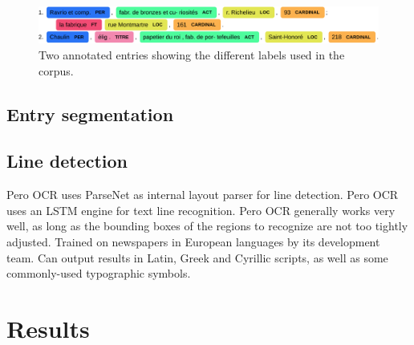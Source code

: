 \documentclass[runningheads,svgnames]{llncs}
\begin{document}
\begin{figure}[htb!]
    \centering
    \includegraphics[width=\textwidth]{images/examples_labeled_entries.pdf}
    \caption{\label{fig:annotated-example}Two annotated entries showing the different labels used in the corpus.}
\end{figure}


\subsection{Entry segmentation}

\subsection{Line detection}
Pero OCR uses ParseNet as internal layout parser for line detection.
Pero OCR uses an LSTM engine for text line recognition.
Pero OCR generally works very well, as long as the bounding boxes of the regions to recognize are not too tightly adjusted.
Trained on newspapers in European languages by its development team.
Can output results in Latin, Greek and Cyrillic scripts, as well as some commonly-used typographic symbols.



\section{Results}



% 
% 
\end{document}
